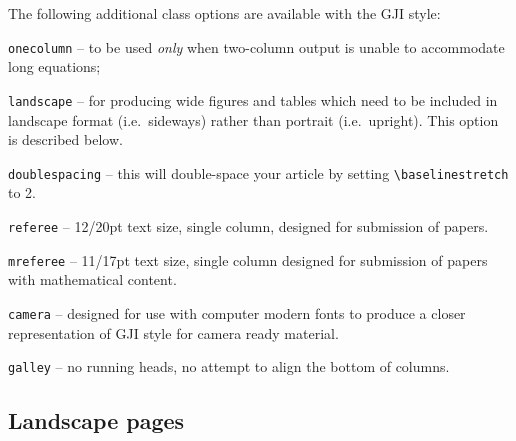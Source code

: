 \documentclass{gji}
\begin{document}
The following additional class options are available with the GJI style:
\begin{description}
  \item \texttt{onecolumn} -- to be used \textit{only} when two-column output
        is unable to accommodate long equations;
  \item \texttt{landscape} -- for producing wide figures and tables which
        need to be included in landscape format (i.e.\ sideways) rather
        than portrait (i.e.\ upright). This option is described below.
  \item \texttt{doublespacing} -- this will double-space your
        article by setting \verb"\baselinestretch" to 2.
  \item \texttt{referee} -- 12/20pt text size, single column,
        designed for submission of papers.
  \item \texttt{mreferee} -- 11/17pt text size, single column
        designed for submission of papers with mathematical content.
  \item \texttt{camera} -- designed for use with computer modern fonts to
        produce a closer representation of GJI style for camera
        ready material.
  \item \texttt{galley} -- no running heads, no attempt to align
        the bottom of columns.
\end{description}


\subsection{Landscape pages}
\end{document}
